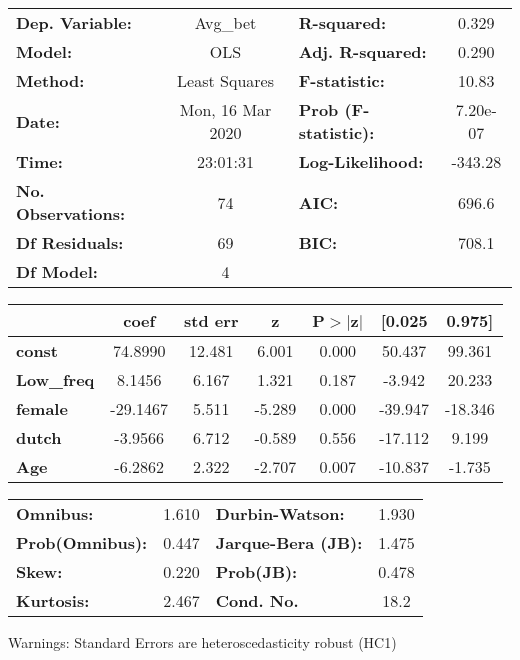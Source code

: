 \documentclass{report}
\begin{document}
\begin{center}
\begin{tabular}{lclc}
\toprule
\textbf{Dep. Variable:}    &     Avg\_bet     & \textbf{  R-squared:         } &     0.329   \\
\textbf{Model:}            &       OLS        & \textbf{  Adj. R-squared:    } &     0.290   \\
\textbf{Method:}           &  Least Squares   & \textbf{  F-statistic:       } &     10.83   \\
\textbf{Date:}             & Mon, 16 Mar 2020 & \textbf{  Prob (F-statistic):} &  7.20e-07   \\
\textbf{Time:}             &     23:01:31     & \textbf{  Log-Likelihood:    } &   -343.28   \\
\textbf{No. Observations:} &          74      & \textbf{  AIC:               } &     696.6   \\
\textbf{Df Residuals:}     &          69      & \textbf{  BIC:               } &     708.1   \\
\textbf{Df Model:}         &           4      & \textbf{                     } &             \\
\bottomrule
\end{tabular}
\begin{tabular}{lcccccc}
                   & \textbf{coef} & \textbf{std err} & \textbf{z} & \textbf{P$> |$z$|$} & \textbf{[0.025} & \textbf{0.975]}  \\
\midrule
\textbf{const}     &      74.8990  &       12.481     &     6.001  &         0.000        &       50.437    &       99.361     \\
\textbf{Low\_freq} &       8.1456  &        6.167     &     1.321  &         0.187        &       -3.942    &       20.233     \\
\textbf{female}    &     -29.1467  &        5.511     &    -5.289  &         0.000        &      -39.947    &      -18.346     \\
\textbf{dutch}     &      -3.9566  &        6.712     &    -0.589  &         0.556        &      -17.112    &        9.199     \\
\textbf{Age}       &      -6.2862  &        2.322     &    -2.707  &         0.007        &      -10.837    &       -1.735     \\
\bottomrule
\end{tabular}
\begin{tabular}{lclc}
\textbf{Omnibus:}       &  1.610 & \textbf{  Durbin-Watson:     } &    1.930  \\
\textbf{Prob(Omnibus):} &  0.447 & \textbf{  Jarque-Bera (JB):  } &    1.475  \\
\textbf{Skew:}          &  0.220 & \textbf{  Prob(JB):          } &    0.478  \\
\textbf{Kurtosis:}      &  2.467 & \textbf{  Cond. No.          } &     18.2  \\
\bottomrule
\end{tabular}
\end{center}

Warnings: \newline
 [1] Standard Errors are heteroscedasticity robust (HC1)
\end{document}
